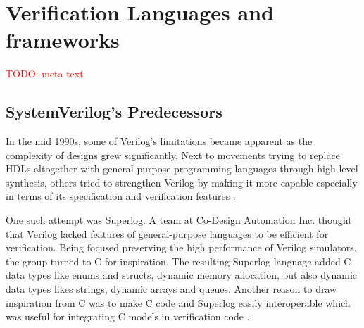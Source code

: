 \documentclass[11pt,a4paper]{report}
\newcommand{\todo}[1]{\textcolor{red}{TODO: #1}}
\begin{document}

\section{Verification Languages and frameworks} %

\todo{meta text}

\subsection{SystemVerilog's Predecessors} %

In the mid 1990s, some of Verilog's limitations became apparent as the complexity of designs grew significantly. Next
to movements trying to replace HDLs altogether with general-purpose programming languages through high-level
synthesis, others tried to strengthen Verilog by making it more capable especially in terms of its specification and
verification features \cite[Sec. 6]{flake2020a}.

One such attempt was Superlog. A team at Co-Design Automation Inc. thought that Verilog lacked features of
general-purpose languages to be efficient for verification. Being focused preserving the high performance of Verilog
simulators, the group turned to C for inspiration. The resulting Superlog language added C data types like enums and
structs, dynamic memory allocation, but also dynamic data types likes strings, dynamic arrays and queues. Another
reason to draw inspiration from C was to make C code and Superlog easily interoperable which was useful for
integrating C models in verification code \cite[Sec. 6]{flake2020a}.
\end{document}
